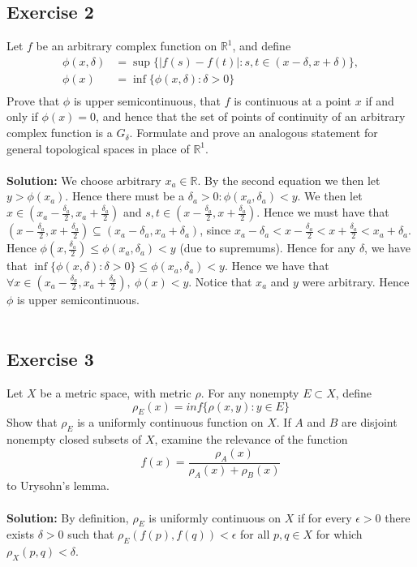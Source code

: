 \documentclass{article}
\begin{document}
\subsection*{Exercise 2}
Let $f$ be an arbitrary complex function on $\mathbb{R}^1$, and define
\begin{equation*}
    \begin{aligned}
        \phi(x, \delta) &= \sup \{ |f(s)-f(t)|:s,t \in (x-\delta, x+\delta) \}, \\
        \phi(x) &= \inf \{ \phi(x, \delta): \delta > 0 \} \\
    \end{aligned}
\end{equation*}
Prove that $\phi$ is upper semicontinuous, that $f$ is continuous at a point $x$ if and only if
$\phi(x)=0$, and hence that the set of points of continuity of an arbitrary complex function
is a $G_\delta$. Formulate and prove an analogous statement for general topological spaces
in place of $\mathbb{R}^1$.
\\\\
\textbf{Solution:}
We choose arbitrary $x_a \in \mathbb{R}$. By the second equation we then let $y > \phi(x_a)$.
Hence there must be a $\delta_a >0: \phi(x_a, \delta_a)<y$.
We then let $x \in (x_a-\frac{\delta_a}{2}, x_a+\frac{\delta_a}{2})$ and $s,t \in (x-\frac{\delta_a}{2}, x+ \frac{\delta_a}{2})$.
Hence we must have that $(x-\frac{\delta_a}{2}, x+\frac{\delta_a}{2}) \subseteq (x_a-\delta_a,x_a+\delta_a)$, since
$x_a - \delta_a < x-\frac{\delta_a}{2} < x+\frac{\delta_a}{2} < x_a+\delta_a$.
Hence $\phi(x, \frac{\delta_a}{2}) \le \phi(x_a, \delta_a) < y$ (due to supremums).
Hence for any $\delta$, we have that $\inf\{\phi(x,\delta):\delta>0\} \le \phi(x_a, \delta_a) < y$.
Hence we have that $\forall x \in (x_a-\frac{\delta_a}{2}, x_a+\frac{\delta_a}{2}), \ \phi(x) < y$.
Notice that $x_a$ and $y$ were arbitrary.
Hence $\phi$ is upper semicontinuous.
\\\\
\subsection*{Exercise 3}
Let $X$ be a metric space, with metric $\rho$.
For any nonempty $E\subset X$, define
\[
    \rho_E(x) = inf\{ \rho(x,y): y\in E \}
\]
Show that $\rho_E$ is a uniformly continuous function on $X$. If $A$ and $B$ are disjoint nonempty closed
subsets of $X$, examine the relevance of the function
\[
    f(x) = \frac{\rho_A(x)}{\rho_A(x)+\rho_B(x)}
\]
to Urysohn's lemma.
\\\\
\textbf{Solution:}
By definition, $\rho_E$ is uniformly continuous on $X$ if for every $\epsilon>0$ there exists $\delta>0$
such that $\rho_E(f(p), f(q)) < \epsilon$ for all $p,q \in X$ for which $\rho_X(p,q) < \delta$.
\end{document}
